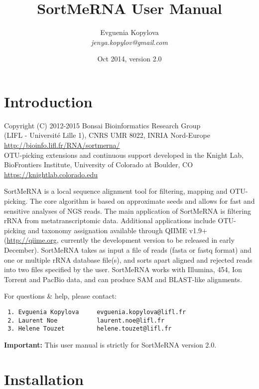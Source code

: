 \documentclass[10pt,a4paper]{article}
\title{SortMeRNA User Manual}
\author{Evguenia Kopylova\\ {\em jenya.kopylov@gmail.com}}
\date{Oct 2014, version 2.0}
\begin{document}
\maketitle

\newpage
\tableofcontents

\newpage
\section{Introduction}

Copyright (C) 2012-2015 Bonsai Bioinformatics Research Group \\
(LIFL - Universit\'{e} Lille 1), CNRS UMR 8022, INRIA Nord-Europe \\
\url{http://bioinfo.lifl.fr/RNA/sortmerna/} \\
OTU-picking extensions and continuous support developed in the Knight Lab, \\
BioFrontiers Institute, University of Colorado at Boulder, CO \\
\url{https://knightlab.colorado.edu}

SortMeRNA is a local sequence alignment tool for filtering, mapping and OTU-picking.
The core algorithm is based on approximate seeds and allows for fast and sensitive analyses
of NGS reads. The main application of SortMeRNA is filtering rRNA from metatranscriptomic data.
Additional applications include OTU-picking and taxonomy assignation available through QIIME v1.9+ (\url{http://qiime.org}, currently the development version to be released in early December).
SortMeRNA takes as input a file of reads (fasta or fastq format) and one or multiple rRNA
database file(s), and sorts apart aligned and rejected reads into two files specified by the user.
SortMeRNA works with Illumina, 454, Ion Torrent and PacBio data, and can produce SAM and
BLAST-like alignments.

For questions \& help, please contact:

\begin{verbatim}
 1. Evguenia Kopylova     evguenia.kopylova@lifl.fr
 2. Laurent Noe           laurent.noe@lifl.fr
 3. Helene Touzet         helene.touzet@lifl.fr
\end{verbatim}

{\bf Important:} This user manual is strictly for SortMeRNA version 2.0. 


\section{Installation}
\end{document}
